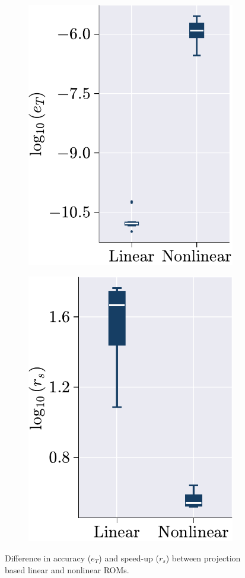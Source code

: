 \documentclass[11pt]{article}
\begin{document}
\begin{figure}[t]
\centering
\begin{subfigure}[b]{0.47\linewidth}
\centering
\includegraphics[height=0.95\linewidth]{error_comp.pdf}
\caption{}
\label{fig:HC_ERROR_SPDUP_c}
\end{subfigure}\hfill
\begin{subfigure}[b]{0.47\linewidth}
\centering
\includegraphics[height=0.95\linewidth]{speed_up_comp.pdf}
\caption{}
\label{fig:HC_ERROR_SPDUP_d}
\end{subfigure}
\caption{Difference in accuracy ($e_T$) and speed-up ($r_s$) between projection based linear and nonlinear ROMs.}
\label{fig:HC_ERROR_SPDUP}
\end{figure}
\end{document}
